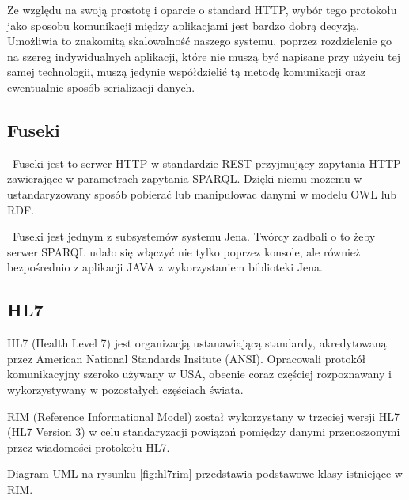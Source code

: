 Ze względu na swoją prostotę i oparcie o standard HTTP, wybór tego protokołu jako sposobu komunikacji między aplikacjami jest bardzo dobrą decyzją. Umożliwia to znakomitą skalowalność naszego systemu, poprzez rozdzielenie go na szereg indywidualnych aplikacji, które nie muszą być napisane przy użyciu tej samej technologii, muszą jedynie współdzielić tą metodę komunikacji oraz ewentualnie sposób serializacji danych.

\subsection{Fuseki}
\label{sec:rest}

~Fuseki jest to serwer HTTP w standardzie REST przyjmujący zapytania HTTP zawierające w parametrach zapytania SPARQL.
Dzięki niemu możemu w ustandaryzowany sposób pobierać lub manipulowac danymi w modelu OWL lub RDF.

~Fuseki jest jednym z subsystemów systemu Jena. Twórcy zadbali o to żeby serwer SPARQL udało się włączyć nie tylko poprzez konsole, ale również bezpośrednio z aplikacji JAVA z wykorzystaniem biblioteki Jena.

\subsection{HL7}
\label{sec:hl7}

HL7 (Health Level 7) jest organizacją ustanawiającą standardy, akredytowaną przez American National Standards Insitute (ANSI). Opracowali protokół komunikacyjny szeroko używany w USA, obecnie coraz częściej rozpoznawany i wykorzystywany w pozostałych częściach świata. \cite {14}

RIM (Reference Informational Model) został wykorzystany w trzeciej wersji HL7 (HL7 Version 3) w celu standaryzacji powiązań pomiędzy danymi przenoszonymi przez wiadomości protokołu HL7. \cite {16}

Diagram UML na rysunku \ref{fig:hl7rim} przedstawia podstawowe klasy istniejące w RIM. \cite {15}


